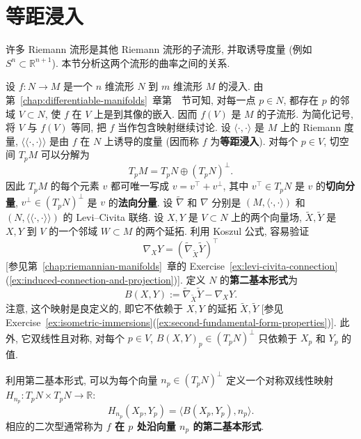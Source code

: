 \section{等距浸入}\label{sec:isometric-immersions}

许多 Riemann 流形是其他 Riemann 流形的子流形, 并取诱导度量 (例如 $S^n\subset\mathbb{R}^{n+1}$). 本节分析这两个流形的曲率之间的关系.

设 $f:N\to M$ 是一个 $n$ 维流形 $N$ 到 $m$ 维流形 $M$ 的浸入. 由第~\ref{chap:differentiable-manifolds}~章第~~节可知, 对每一点 $p\in N$, 都存在 $p$ 的邻域 $V\subset N$, 使 $f$ 在 $V$ 上是到其像的嵌入. 因而 $f(V)$ 是 $M$ 的子流形. 为简化记号, 将 $V$ 与 $f(V)$ 等同, 把 $f$ 当作包含映射继续讨论. 设 $\langle\cdot,\cdot\rangle$ 是 $M$ 上的 Riemann 度量, $\langle\!\langle\cdot,\cdot\rangle\!\rangle$ 是由 $f$ 在 $N$ 上诱导的度量 (因而称 $f$ 为\textbf{等距浸入}). 对每个 $p\in V$, 切空间 $T_pM$ 可以分解为
\[
  T_pM=T_pN\oplus(T_pN)^\perp.
\]
因此 $T_pM$ 的每个元素 $v$ 都可唯一写成 $v=v^\top+v^\perp$, 其中 $v^\top\in T_pN$ 是 $v$ 的\textbf{切向分量}, $v^\perp\in(T_pN)^\perp$ 是 $v$ 的\textbf{法向分量}. 设 $\widetilde\nabla$ 和 $\nabla$ 分别是 $(M,\langle\cdot,\cdot\rangle)$ 和 $(N,\langle\!\langle\cdot,\cdot\rangle\!\rangle)$ 的 Levi–Civita 联络. 设 $X,Y$ 是 $V\subset N$ 上的两个向量场, $\widetilde X,\widetilde Y$ 是 $X,Y$ 到 $V$ 的一个邻域 $W\subset M$ 的两个延拓. 利用 Koszul 公式, 容易验证
\[
  \nabla_XY=(\widetilde\nabla_{\widetilde X}\widetilde Y)^\top
\]
[参见第~\ref{chap:riemannian-manifolds}~章的 Exercise~\ref{ex:levi-civita-connection}(\ref{ex:induced-connection-and-projection})]. 定义 $N$ 的\textbf{第二基本形式}为
\[
  B(X,Y):=\widetilde\nabla_{\widetilde X}\widetilde Y-\nabla_XY.
\]
注意, 这个映射是良定义的, 即它不依赖于 $X,Y$ 的延拓 $\widetilde X,\widetilde Y$ [参见 Exercise~\ref{ex:isometric-immersions}(\ref{ex:second-fundamental-form-properties})]. 此外, 它双线性且对称, 对每个 $p\in V$, $B(X,Y)_p\in(T_pN)^\perp$ 只依赖于 $X_p$ 和 $Y_p$ 的值.

利用第二基本形式, 可以为每个向量 $n_p\in(T_pN)^\perp$ 定义一个对称双线性映射 $H_{n_p}:T_pN\times T_pN\to\mathbb{R}$:
\[
  H_{n_p}(X_p,Y_p)=\langle B(X_p,Y_p),n_p\rangle.
\]
相应的二次型通常称为 \textbf{$f$ 在 $p$ 处沿向量 $n_p$ 的第二基本形式}.

